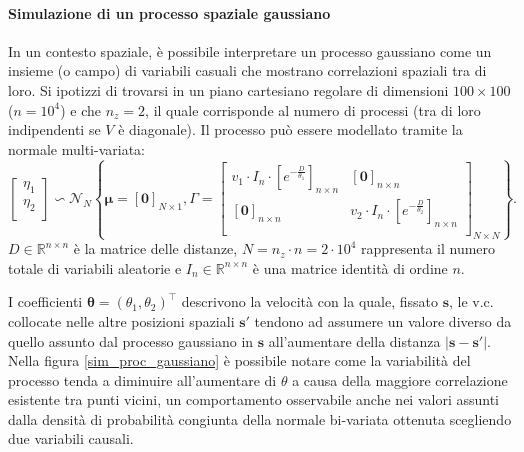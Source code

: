 \paragraph{Simulazione di un processo spaziale gaussiano}
In un contesto spaziale, è possibile interpretare un processo gaussiano come un insieme (o campo) di variabili casuali che mostrano correlazioni spaziali tra di loro. Si ipotizzi di trovarsi in un piano cartesiano regolare di dimensioni $100\times100$ ($n=10^4$) e che $n_z =2$, il quale corrisponde al numero di processi (tra di loro indipendenti se $V$ è diagonale). Il processo può essere modellato tramite la normale multi-variata:
\[
	\begin{bmatrix}
		\eta_1 \\
		\eta_2 \\
	\end{bmatrix}\backsim \mathcal{N}_N\left\{\boldsymbol{\mu}=[\mathbf{0}]_{N\times 1}, \Gamma = 
	\begin{bmatrix}
		v_1\cdot I_{n}\cdot [e^{-\frac{D}{\theta_1}}]_{n\times n} & [\mathbf{0}]_{n\times n} \\
		[\mathbf{0}]_{n\times n} & v_2\cdot I_{n}\cdot [e^{-\frac{D}{\theta_2}}]_{n\times n} \\
	\end{bmatrix}_{N\times N}
	\right\}.
\]
$D\in\mathbb{R}^{n\times n}$ è la matrice delle distanze, $N=n_z\cdot n = 2\cdot 10^4$ rappresenta il numero totale di variabili aleatorie e $I_n\in\mathbb{R}^{n\times n}$ è una matrice identità di ordine $n$.
\par I coefficienti $\boldsymbol{\theta} = (\theta_1,\theta_2)^\top$ descrivono la velocità con la quale, fissato $\mathbf{s}$, le v.c. collocate nelle altre posizioni spaziali $\mathbf{s}'$ tendono ad assumere un valore diverso da quello assunto dal processo gaussiano in $\mathbf{s}$ all'aumentare della distanza $|\mathbf{s} - \mathbf{s}'|$. Nella figura \ref{sim_proc_gaussiano} è possibile notare come la variabilità del processo tenda a diminuire all'aumentare di $\theta$ a causa della maggiore correlazione esistente tra punti vicini, un comportamento osservabile anche nei valori assunti dalla densità di probabilità congiunta della normale bi-variata ottenuta scegliendo due variabili causali.

